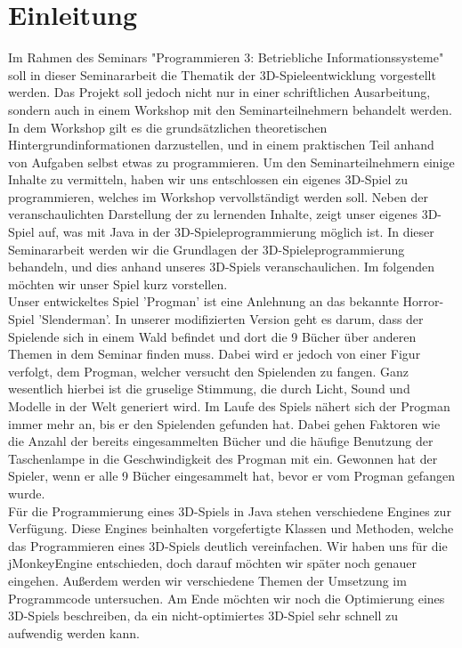 \chapter{Einleitung}\label{ch:einleitung}
Im Rahmen des Seminars "Programmieren 3: Betriebliche Informationssysteme" soll in dieser Seminararbeit die Thematik der 3D-Spieleentwicklung vorgestellt werden. Das Projekt soll jedoch nicht nur in einer schriftlichen Ausarbeitung, sondern auch in einem Workshop mit den Seminarteilnehmern behandelt werden. In dem Workshop gilt es die grundsätzlichen theoretischen Hintergrundinformationen darzustellen, und in einem praktischen Teil anhand von Aufgaben selbst etwas zu programmieren. Um den Seminarteilnehmern einige Inhalte zu vermitteln, haben wir uns entschlossen ein eigenes 3D-Spiel zu programmieren, welches im Workshop vervollständigt werden soll. Neben der veranschaulichten Darstellung der zu lernenden Inhalte, zeigt unser eigenes 3D-Spiel auf, was mit Java in der 3D-Spieleprogrammierung möglich ist. In dieser Seminararbeit werden wir die Grundlagen der 3D-Spieleprogrammierung behandeln, und dies anhand unseres 3D-Spiels veranschaulichen. Im folgenden möchten wir unser Spiel kurz vorstellen.\\

Unser entwickeltes Spiel 'Progman' ist eine Anlehnung an das bekannte Horror-Spiel 'Slenderman'. In unserer modifizierten Version geht es darum, dass der Spielende sich in einem Wald befindet und dort die 9 Bücher über anderen Themen in dem Seminar finden muss. Dabei wird er jedoch von einer Figur verfolgt, dem Progman, welcher versucht den Spielenden zu fangen. Ganz wesentlich hierbei ist die gruselige Stimmung, die durch Licht, Sound und Modelle in der Welt generiert wird. Im Laufe des Spiels nähert sich der Progman immer mehr an, bis er den Spielenden gefunden hat. Dabei gehen Faktoren wie die Anzahl der bereits eingesammelten Bücher und die häufige Benutzung der Taschenlampe in die Geschwindigkeit des Progman mit ein. Gewonnen hat der Spieler, wenn er alle 9 Bücher eingesammelt hat, bevor er vom Progman gefangen wurde. \\

Für die Programmierung eines 3D-Spiels in Java stehen verschiedene Engines zur Verfügung. Diese Engines beinhalten vorgefertigte Klassen und Methoden, welche das Programmieren eines 3D-Spiels deutlich vereinfachen. Wir haben uns für die jMonkeyEngine entschieden, doch darauf möchten wir später noch genauer eingehen. Außerdem werden wir verschiedene Themen der Umsetzung im Programmcode untersuchen. Am Ende möchten wir noch die Optimierung eines 3D-Spiels beschreiben, da ein nicht-optimiertes 3D-Spiel sehr schnell zu aufwendig werden kann.



